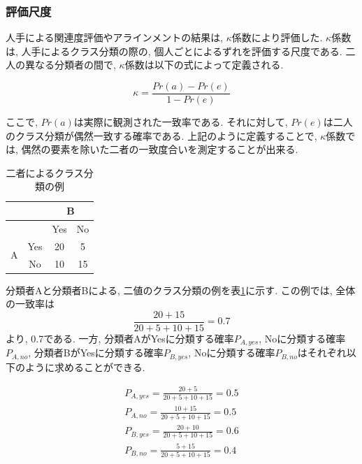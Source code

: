 \documentclass[12pt]{jarticle}
\begin{document}
\subsubsection{評価尺度}
\def\kappac{$\kappa$係数}

人手による関連度評価やアラインメントの結果は, \kappac\cite{kappa}により評価した. \kappac は, 人手によるクラス分類の際の, 個人ごとによるずれを評価する尺度である. 二人の異なる分類者の間で, \kappac は以下の式によって定義される. 

\begin{equation}
\kappa = \frac{Pr(a) - Pr(e)}{1 - Pr(e)}
\end{equation}

ここで, $Pr(a)$は実際に観測された一致率である. それに対して, $Pr(e)$は二人のクラス分類が偶然一致する確率である. 
上記のように定義することで, \kappac では, 偶然の要素を除いた二者の一致度合いを測定することが出来る. 

\begin{table}
\begin{center}
\caption{二者によるクラス分類の例}
\label{classifi_2}
\begin{tabular}[t]{|c|c|c|c|}
  \hline
  \multirow{2}{*}{} & & \multicolumn{2}{|c|}{B} \\ \hline
                           &  & Yes & No \\ \hline
  \multirow{2}{*}{A} & Yes    & 20  &  5   \\ \cline{2-4}
                     & No     & 10  & 15  \\ \hline
\end{tabular}
\end{center}
\end{table}

分類者Aと分類者Bによる, 二値のクラス分類の例を表\ref{classifi_2}に示す. 
この例では, 全体の一致率は
\begin{equation}
\frac{20 + 15}{20 + 5 + 10 + 15} = 0.7
\end{equation}
より, 0.7である. 
一方, 分類者AがYesに分類する確率$P_{A,yes}$, Noに分類する確率$P_{A,no}$, 分類者BがYesに分類する確率$P_{B, yes}$, Noに分類する確率$P_{B, no}$はそれぞれ以下のように求めることができる. 

\begin{eqnarray}
P_{A,yes} = \frac{20 +  5}{20 + 5 + 10 + 15} = 0.5\\
P_{A,no}  = \frac{10 + 15}{20 + 5 + 10 + 15} = 0.5\\
P_{B,yes} = \frac{20 + 10}{20 + 5 + 10 + 15} = 0.6\\
P_{B,no}  = \frac{ 5 + 15}{20 + 5 + 10 + 15} = 0.4
\end{eqnarray}
\end{document}
